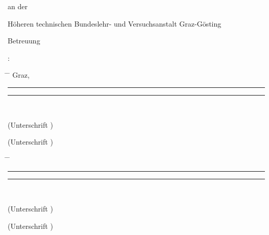\begin{center}
\vspace{1.0cm}

\begin{minipage}[t][1.5cm][t]{\textwidth}%
  \vspace{0pt}\raggedright\thesistitlefontnormalsize\sffamily
  an der

  H\"{o}heren technischen Bundeslehr- und Versuchsanstalt Graz-Gösting
\end{minipage}

\begin{minipage}[t][1.6cm][t]{\textwidth}%
  \vspace{0pt}\sffamily\thesistitlefontnormalsize\raggedright
  Betreuung

  \tuinfthesisbetreuung: \tuinfthesisbetreins
\end{minipage}

\begin{minipage}[t][1.6cm][t]{\textwidth}%
  \vspace{0pt}\sffamily\thesistitlefontnormalsize
  \begin{tabbing}%
    \hspace{44mm} \= \hspace{66mm} \= \hspace{51mm} \kill
    Graz, \tuinfthesisdate \> {\raggedright\rule{51mm}{0.5pt}} \> {\raggedright\rule{51mm}{0.5pt}} \\
    \> \begin{minipage}[t][0.5cm][t]{51mm}\centering (Unterschrift \tuinfthesisauthoreins)\end{minipage}
    \> \begin{minipage}[t][0.5cm][t]{51mm}\centering (Unterschrift \tuinfthesisbetreuung)\end{minipage}
  \end{tabbing}
\end{minipage}

\begin{minipage}[t][1.6cm][t]{\textwidth}%
  \vspace{0pt}\sffamily\thesistitlefontnormalsize
  \begin{tabbing}%
    \hspace{44mm} \= \hspace{66mm} \= \hspace{51mm} \kill
    \> {\raggedright\rule{51mm}{0.5pt}} \> {\raggedright\rule{51mm}{0.5pt}} \\
    \> \begin{minipage}[t][0.5cm][t]{51mm}\centering (Unterschrift \tuinfthesisauthorzwei)\end{minipage}
    \> \begin{minipage}[t][0.5cm][t]{51mm}\centering (Unterschrift \tuinfthesisauthordrei)\end{minipage}
  \end{tabbing}
\end{minipage}

\end{center}

\cleardoublepage
{}
\setlength{\baselineskip}{\tmpbaselineskip}
\setlength{\parindent}{\tmpparindent}
\restoregeometry
